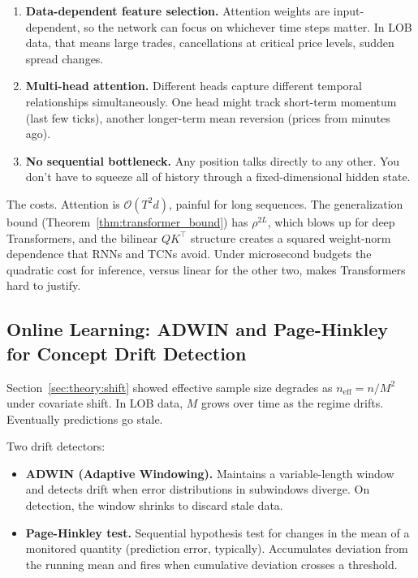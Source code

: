 \documentclass[11pt]{article}
\theoremstyle{definition}
\theoremstyle{remark}
\newcommand{\cO}{\mathcal{O}}
\begin{document}
\begin{enumerate}
    \item \textbf{Data-dependent feature selection.}  Attention weights are input-dependent, so the network can focus on whichever time steps matter.  In LOB data, that means large trades, cancellations at critical price levels, sudden spread changes.

    \item \textbf{Multi-head attention.}  Different heads capture different temporal relationships simultaneously.  One head might track short-term momentum (last few ticks), another longer-term mean reversion (prices from minutes ago).

    \item \textbf{No sequential bottleneck.}  Any position talks directly to any other.  You don't have to squeeze all of history through a fixed-dimensional hidden state.
\end{enumerate}

The costs.
Attention is $\cO(T^2 d)$, painful for long sequences.
The generalization bound (Theorem~\ref{thm:transformer_bound}) has $\rho^{2L}$, which blows up for deep Transformers, and the bilinear $QK^\top$ structure creates a squared weight-norm dependence that RNNs and TCNs avoid.
Under microsecond budgets the quadratic cost for inference, versus linear for the other two, makes Transformers hard to justify.

\subsection{Online Learning: ADWIN and Page-Hinkley for Concept Drift Detection}\label{sec:arch:online}

Section~\ref{sec:theory:shift} showed effective sample size degrades as $n_{\mathrm{eff}} = n/M^2$ under covariate shift.
In LOB data, $M$ grows over time as the regime drifts.
Eventually predictions go stale.

Two drift detectors:
\begin{itemize}
    \item \textbf{ADWIN (Adaptive Windowing).}  Maintains a variable-length window and detects drift when error distributions in subwindows diverge.  On detection, the window shrinks to discard stale data.

    \item \textbf{Page-Hinkley test.}  Sequential hypothesis test for changes in the mean of a monitored quantity (prediction error, typically).  Accumulates deviation from the running mean and fires when cumulative deviation crosses a threshold.
\end{itemize}
\end{document}
